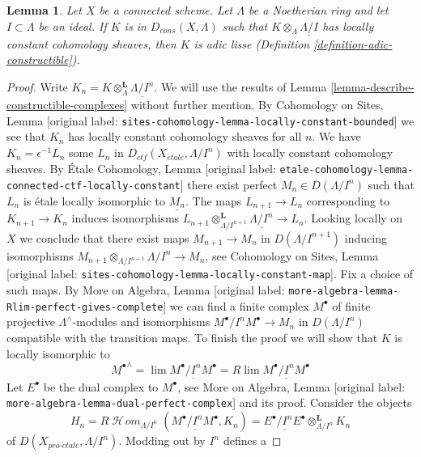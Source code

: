 \documentclass[10pt,a4paper]{article}
\theoremstyle{plain}
\newtheorem{lemma}[subsection]{Lemma}
\theoremstyle{definition}
\theoremstyle{remark}
\numberwithin{equation}{subsection}
\def\lim{\mathop{\mathrm{lim}}\nolimits}
\def\SheafHom{\mathop{\mathcal{H}\!\mathit{om}}\nolimits}
\def\proetale{{pro\text{-}\acute{e}tale}}
\def\etale{{\acute{e}tale}}
\begin{document}
\begin{lemma}
\label{lemma-connected-adic-lisse}
Let $X$ be a connected scheme. Let $\Lambda$ be a Noetherian ring and let
$I \subset \Lambda$ be an ideal. If $K$ is in $D_{cons}(X, \Lambda)$
such that $K \otimes_\Lambda \underline{\Lambda/I}$
has locally constant cohomology sheaves, then $K$ is adic lisse
(Definition \ref{definition-adic-constructible}).
\end{lemma}

\begin{proof}
Write $K_n = K \otimes_\Lambda^\mathbf{L} \underline{\Lambda/I^n}$.
We will use the results of Lemma \ref{lemma-describe-constructible-complexes}
without further mention. By Cohomology on Sites, Lemma
[original label: \nolinkurl{sites-cohomology-lemma-locally-constant-bounded}]
we see that $K_n$ has locally constant cohomology sheaves for all $n$.
We have $K_n = \epsilon^{-1}L_n$ some $L_n$ in
$D_{ctf}(X_\etale, \Lambda/I^n)$ with locally constant cohomology sheaves.
By \'Etale Cohomology, Lemma
[original label: \nolinkurl{etale-cohomology-lemma-connected-ctf-locally-constant}]
there exist perfect $M_n \in D(\Lambda/I^n)$
such that $L_n$ is \'etale locally isomorphic to $\underline{M_n}$.
The maps $L_{n + 1} \to L_n$ corresponding to $K_{n + 1} \to K_n$
induces isomorphisms
$L_{n + 1} \otimes_{\Lambda/I^{n + 1}}^\mathbf{L} \underline{\Lambda/I^n}
\to L_n$. Looking locally on $X$ we conclude that there
exist maps $M_{n + 1} \to M_n$ in $D(\Lambda/I^{n + 1})$
inducing isomorphisms
$M_{n + 1} \otimes_{\Lambda/I^{n + 1}} \Lambda/I^n \to M_n$, see
Cohomology on Sites, Lemma [original label: \nolinkurl{sites-cohomology-lemma-locally-constant-map}].
Fix a choice of such maps. By
More on Algebra, Lemma [original label: \nolinkurl{more-algebra-lemma-Rlim-perfect-gives-complete}]
we can find a finite complex $M^\bullet$ of finite projective
$\Lambda^\wedge$-modules and isomorphisms $M^\bullet/I^nM^\bullet \to M_n$
in $D(\Lambda/I^n)$ compatible with the transition maps.
To finish the proof we will show that $K$ is locally isomorphic
to
$$
\underline{M^\bullet}^\wedge =
\lim \underline{M^\bullet/I^nM^\bullet} =
R\lim \underline{M^\bullet/I^nM^\bullet}
$$
Let $E^\bullet$ be the dual complex to $M^\bullet$, see
More on Algebra, Lemma [original label: \nolinkurl{more-algebra-lemma-dual-perfect-complex}]
and its proof. Consider the objects
$$
H_n =
R\SheafHom_{\Lambda/I^n}(\underline{M^\bullet/I^nM^\bullet}, K_n) =
\underline{E^\bullet/I^nE^\bullet} \otimes_{\Lambda/I^n}^\mathbf{L} K_n
$$
of $D(X_\proetale, \Lambda/I^n)$. Modding out by $I^n$ defines a

\end{proof}
\end{document}

